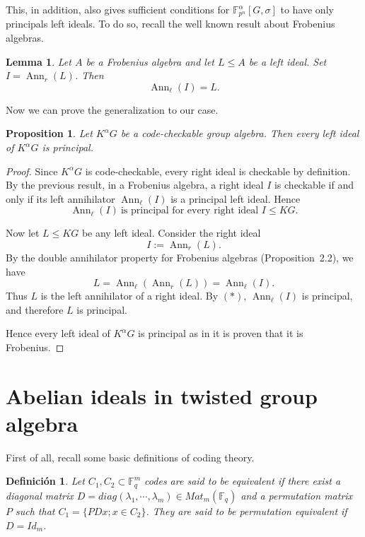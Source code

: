 \documentclass{article}
\newtheorem{lemma}[theorem]{Lemma}
\newtheorem{proposition}[theorem]{Proposition}
\newtheorem{definition}{Definición}
\DeclareMathOperator{\Ann}{Ann}
\begin{document}
This, in addition, also gives sufficient conditions for $\mathbb{F}_{p^n}^\alpha[G,\sigma]$ to have only principals left ideals. To do so, recall the well known result about Frobenius algebras.
\begin{lemma}
Let $A$ be a Frobenius algebra and let $L \le A$ be a left ideal.  
Set $I = \Ann_r(L)$. Then
\[
\Ann_\ell(I) = L.
\]
\end{lemma}

Now we can prove the generalization to our case. 

\begin{proposition}

Let $K^\alpha G$ be a code\!-checkable group algebra. Then every left ideal of $K^\alpha G$
is principal.
    
\end{proposition}
\begin{proof}
Since $K^\alpha G$ is code\!-checkable, every right ideal is checkable by definition.
By the previous result, in a Frobenius algebra,
a right ideal $I$ is checkable if and only if its left annihilator
$\Ann_\ell(I)$ is a principal left ideal. Hence
\[
\Ann_\ell(I) \ \text{is principal for every right ideal } I \le KG.
\tag{$\ast$}
\]

Now let $L \le KG$ be any left ideal.  Consider the right ideal
\[
I := \Ann_r(L).
\]
By the double annihilator property for Frobenius algebras (Proposition~2.2),
we have
\[
L = \Ann_\ell(\Ann_r(L)) = \Ann_\ell(I).
\]
Thus $L$ is the left annihilator of a right ideal.  By $(\ast)$,
$\Ann_\ell(I)$ is principal, and therefore $L$ is principal.

Hence every left ideal of $K^\alpha G$ is principal as in \cite{Behajaina2024Twisted} it is proven that it is Frobenius.
\end{proof}

\section{Abelian ideals in twisted group algebra}

First of all, recall some basic definitions of coding theory.
\begin{definition}
    Let $C_1, C_2 \subset \mathbb{F}_q^m$ codes are said to be equivalent if there exist a diagonal matrix $D = diag(\lambda_1, \cdots, \lambda_m) \in Mat_m(\mathbb{F}_q)$ and a permutation matrix $P$ such that  $C_1 = \{PDx; x \in C_2 \}$. They are said to be permutation equivalent if $D= Id_m$.
\end{definition}
\end{document}
